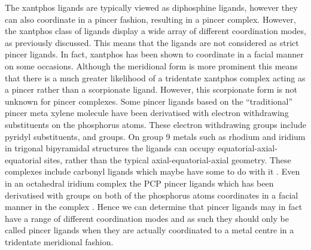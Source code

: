 The xantphos ligands are typically viewed as diphosphine ligands, however they can also coordinate in a pincer fashion, resulting in a pincer complex.  However, the xantphos class of ligands display a wide array of different coordination modes, as previously discussed.  This means that the ligands are not considered as strict pincer ligands.  In fact, xantphos has been shown to coordinate in a facial manner on some occasions.  Although the meridional form is more prominent this means that there is a much greater likelihood of a tridentate xantphos complex acting as a pincer rather than a scorpionate ligand.  However, this scorpionate form is not unknown for pincer complexes.  Some pincer ligands based on the ``traditional'' pincer meta xylene molecule have been derivatised with electron withdrawing substituents on the phosphorus atoms.  These electron withdrawing groups include pyridyl substituents, and  groups.  On group 9 metals such as rhodium and iridium in trigonal bipyramidal structures the ligands can occupy equatorial-axial-equatorial sites, rather than the typical axial-equatorial-axial geometry.  These complexes include carbonyl ligands which maybe have some to do with it .  Even in an octahedral iridium complex the PCP pincer ligands which has been derivatised with  groups on both of the phosphorus atoms coordinates in a facial manner in the complex \ce{[Ir(PCP)(H)2PR3]}.  Hence we can determine that pincer ligands may in fact have a range of different coordination modes and as such they should only be called pincer ligands when they are actually coordinated to a metal centre in a tridentate meridional fashion.  

